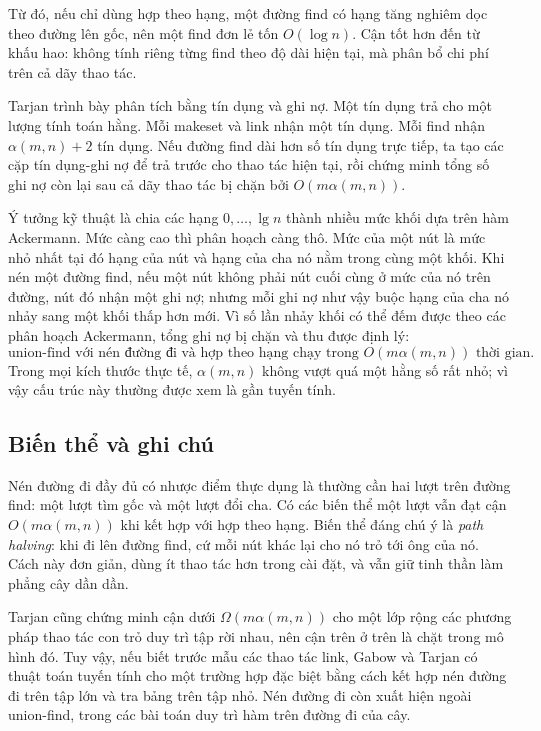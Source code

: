 \documentclass[11pt]{article}
\begin{document}
Từ đó, nếu chỉ dùng hợp theo hạng, một đường find có hạng tăng nghiêm dọc theo
đường lên gốc, nên một find đơn lẻ tốn \(O(\log n)\). Cận tốt hơn đến từ khấu
hao: không tính riêng từng find theo độ dài hiện tại, mà phân bổ chi phí trên cả
dãy thao tác.

Tarjan trình bày phân tích bằng tín dụng và ghi nợ. Một tín dụng trả cho một
lượng tính toán hằng. Mỗi makeset và link nhận một tín dụng. Mỗi find nhận
\(\alpha(m,n)+2\) tín dụng. Nếu đường find dài hơn số tín dụng trực tiếp, ta tạo
các cặp tín dụng-ghi nợ để trả trước cho thao tác hiện tại, rồi chứng minh tổng
số ghi nợ còn lại sau cả dãy thao tác bị chặn bởi \(O(m\alpha(m,n))\).

Ý tưởng kỹ thuật là chia các hạng \(0,\ldots,\lg n\) thành nhiều mức khối dựa
trên hàm Ackermann. Mức càng cao thì phân hoạch càng thô. Mức của một nút là
mức nhỏ nhất tại đó hạng của nút và hạng của cha nó nằm trong cùng một khối.
Khi nén một đường find, nếu một nút không phải nút cuối cùng ở mức của nó trên
đường, nút đó nhận một ghi nợ; nhưng mỗi ghi nợ như vậy buộc hạng của cha nó
nhảy sang một khối thấp hơn mới. Vì số lần nhảy khối có thể đếm được theo các
phân hoạch Ackermann, tổng ghi nợ bị chặn và thu được định lý:
\[
  \text{union-find với nén đường đi và hợp theo hạng chạy trong }
  O(m\alpha(m,n)) \text{ thời gian.}
\]
Trong mọi kích thước thực tế, \(\alpha(m,n)\) không vượt quá một hằng số rất
nhỏ; vì vậy cấu trúc này thường được xem là gần tuyến tính.

\subsection*{Biến thể và ghi chú}

Nén đường đi đầy đủ có nhược điểm thực dụng là thường cần hai lượt trên đường
find: một lượt tìm gốc và một lượt đổi cha. Có các biến thể một lượt vẫn đạt
cận \(O(m\alpha(m,n))\) khi kết hợp với hợp theo hạng. Biến thể đáng chú ý là
\emph{path halving}: khi đi lên đường find, cứ mỗi nút khác lại cho nó trỏ tới
ông của nó. Cách này đơn giản, dùng ít thao tác hơn trong cài đặt, và vẫn giữ
tinh thần làm phẳng cây dần dần.

Tarjan cũng chứng minh cận dưới \(\Omega(m\alpha(m,n))\) cho một lớp rộng các
phương pháp thao tác con trỏ duy trì tập rời nhau, nên cận trên ở trên là chặt
trong mô hình đó. Tuy vậy, nếu biết trước mẫu các thao tác link, Gabow và Tarjan
có thuật toán tuyến tính cho một trường hợp đặc biệt bằng cách kết hợp nén đường
đi trên tập lớn và tra bảng trên tập nhỏ. Nén đường đi còn xuất hiện ngoài
union-find, trong các bài toán duy trì hàm trên đường đi của cây.
\end{document}
